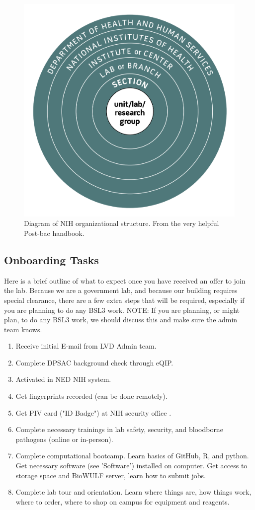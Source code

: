 \documentclass[10pt, a4paper, twocolumn]{article} %
\begin{document}
\begin{figure}
	\includegraphics[width=\linewidth]{unitlab.png} %
	\caption{Diagram of NIH organizational structure. From the very helpful Post-bac handbook. \citep{}} %
	\label{unit_organization} %
\end{figure}

\subsection{Onboarding Tasks}
Here is a brief outline of what to expect once you have received an offer to join the lab. Because we are a government lab, and because our building requires special clearance, there are a few extra steps that will be required, especially if you are planning to do any BSL3 work.
NOTE: If you are planning, or might plan, to do any BSL3 work, we should discuss this and make sure the admin team knows.
\begin{enumerate}
\item Receive initial E-mail from LVD Admin team.
\item Complete DPSAC background check through eQIP.
\item Activated in NED NIH system.
\item Get fingerprints recorded (can be done remotely).
\item Get PIV card ("ID Badge") at NIH security office .
\item Complete necessary trainings in lab safety, security, and bloodborne pathogens (online or in-person).
\item Complete computational bootcamp. Learn basics of GitHub, R, and python. Get necessary software (see 'Software') installed on computer. Get access to storage space and BioWULF server, learn how to submit jobs.
\item Complete lab tour and orientation.	Learn where things are, how things work, where to order, where to shop on campus for equipment and reagents.
\end{enumerate}
\end{document}
